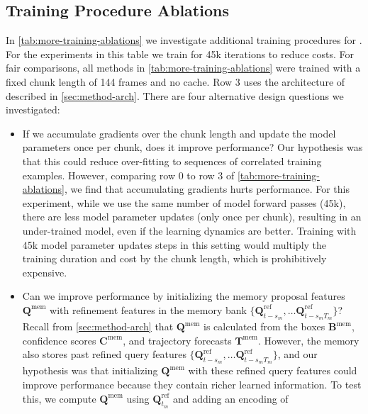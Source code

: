 


\subsection{Training Procedure Ablations}


In \cref{tab:more-training-ablations} we investigate
additional training procedures for \ourmodel{}.
For the experiments in this table we train for 45k iterations to reduce costs.
For fair comparisons, all methods in \cref{tab:more-training-ablations} were trained
with a fixed chunk length of 144 frames and no cache.
Row 3 uses the architecture of \ourmodel{} described in \cref{sec:method-arch}.
There are four alternative design questions we investigated:
\begin{itemize}
    \item If we accumulate gradients over the chunk length and update the model parameters once per chunk, does it improve performance?
    Our hypothesis was that this could reduce over-fitting to sequences of correlated training examples.
    However, comparing row 0 to row 3 of \cref{tab:more-training-ablations}, we find that
    accumulating gradients hurts performance.
    For this experiment, while we use the same number of model forward passes (45k), there are less model parameter updates (only once per chunk),
    resulting in an under-trained model, even if the learning dynamics are better.
    Training with 45k model parameter updates steps in this setting would multiply the training duration and cost by the chunk length, which is prohibitively expensive.
    \item Can we improve performance by initializing the memory proposal features $\mathbf{Q}^\mathrm{mem}$ with
    refinement features in the memory bank $\{\mathbf{Q}^\mathrm{ref}_{t - s_m}, \dots \mathbf{Q}^\mathrm{ref}_{t - s_m T_m}\}$? 
    Recall from \cref{sec:method-arch} that $\mathbf{Q}^\mathrm{mem}$ 
    is calculated from the boxes $\mathbf{B}^\mathrm{mem}$, confidence scores $\mathbf{C}^\mathrm{mem}$,
    and trajectory forecasts $\mathbf{T}^\mathrm{mem}$.
    However, the memory also stores past refined query features $\{\mathbf{Q}^\mathrm{ref}_{t - s_m}, \dots \mathbf{Q}^\mathrm{ref}_{t - s_m T_m}\}$, and
    our hypothesis was that initializing $\mathbf{Q}^\mathrm{mem}$ with these refined query features could improve performance
    because they contain richer learned information.
    To test this, we compute $\mathbf{Q}^\mathrm{mem}$ using $\mathbf{Q}^\mathrm{{ref}}_{t_m}$ and adding an encoding of

\end{itemize}
